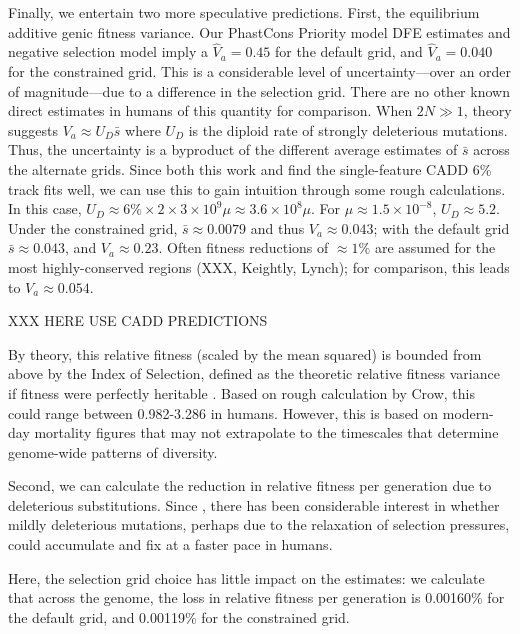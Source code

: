 \documentclass[11pt]{article}
\begin{document}
Finally, we entertain two more speculative predictions. First, the equilibrium
additive genic fitness variance. Our PhastCons Priority model DFE estimates and
negative selection model imply a $\widehat{V}_a = 0.45$ for the default grid,
and $\widehat{V}_a = 0.040$ for the constrained grid. This is a considerable
level of uncertainty---over an order of magnitude---due to a difference in the
selection grid. There are no other known direct estimates in humans of this
quantity for comparison. When $2N \gg 1$, theory suggests $V_a \approx
U_D\bar{s}$ where $U_D$ is the diploid rate of strongly deleterious mutations.
Thus, the uncertainty is a byproduct of the different average estimates of
$\bar{s}$ across the alternate grids. Since both this work and
\textcite{Murphy2022-sj} find the single-feature CADD 6\% track fits well, we
can use this to gain intuition through some rough calculations. In this case,
$U_D \approx 6\% \times 2 \times 3 \times 10^{9} \mu \approx 3.6 \times 10^{8}
\mu$. For $\mu \approx 1.5 \times 10^{-8}$, $U_D \approx 5.2$. Under the
constrained grid, ${\bar{s}} \approx 0.0079$ and thus $V_a \approx 0.043$; with
the default grid $\bar{s} \approx 0.043$, and $V_a \approx 0.23$. Often fitness
reductions of $\approx 1\%$ are assumed for the most highly-conserved regions
(XXX, Keightly, Lynch); for comparison, this leads to $V_a \approx 0.054$.

XXX HERE  USE CADD PREDICTIONS

By theory, this relative fitness (scaled by the mean squared) is
bounded from above by the Index of Selection, defined as the theoretic relative
fitness variance if fitness were perfectly heritable \parencite{Crow1958-pc}.
Based on rough calculation by Crow, this could range between 0.982-3.286 in
humans. However, this is based on modern-day mortality figures that may not
extrapolate to the timescales that determine genome-wide patterns of diversity. 

Second, we can calculate the reduction in relative fitness per generation due
to deleterious substitutions. Since \textcite{Muller1950-ta}, there has been
considerable interest in whether mildly deleterious mutations, perhaps due to
the relaxation of selection pressures, could accumulate and fix at a faster
pace in humans.

Here, the selection grid choice has little impact
on the estimates: we calculate that across the genome, the loss in relative
fitness per generation is 0.00160\% for the default grid, and 0.00119\% for the
constrained grid.
\end{document}
